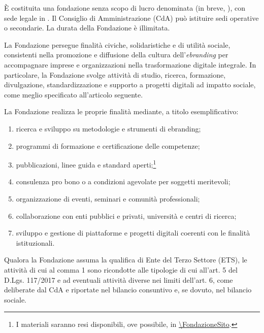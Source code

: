 \begin{center}
\end{center}

\maketitle

 È costituita una fondazione senza scopo di lucro denominata  (in breve, \FondazioneSigla), con sede legale in . Il Consiglio di Amministrazione (CdA) può istituire sedi operative o secondarie.
 La durata della Fondazione è illimitata.

 La Fondazione persegue finalità civiche, solidaristiche e di utilità sociale, consistenti nella promozione e diffusione della cultura dell'\emph{ebranding} per accompagnare imprese e organizzazioni nella trasformazione digitale integrale.
 In particolare, la Fondazione svolge attività di studio, ricerca, formazione, divulgazione, standardizzazione e supporto a progetti digitali ad impatto sociale, come meglio specificato all'articolo seguente.

 La Fondazione realizza le proprie finalità mediante, a titolo esemplificativo:
\FondazioneAttivita
\begin{enumerate}[label=\alph*)]
  \item ricerca e sviluppo su metodologie e strumenti di ebranding;
  \item programmi di formazione e certificazione delle competenze;
  \item pubblicazioni, linee guida e standard aperti;\footnote{I materiali saranno resi disponibili, ove possibile, in \url{\FondazioneSito}.}
  \item consulenza pro bono o a condizioni agevolate per soggetti meritevoli;
  \item organizzazione di eventi, seminari e comunità professionali;
  \item collaborazione con enti pubblici e privati, università e centri di ricerca;
  \item sviluppo e gestione di piattaforme e progetti digitali coerenti con le finalità istituzionali.
\end{enumerate}
\ifETS
{} Qualora la Fondazione assuma la qualifica di Ente del Terzo Settore (ETS), le attività di cui al comma 1 sono ricondotte alle tipologie di cui all'art. 5 del D.Lgs. 117/2017 e ad eventuali attività diverse nei limiti dell'art. 6, come deliberate dal CdA e riportate nel bilancio consuntivo e, se dovuto, nel bilancio sociale.
\fi

